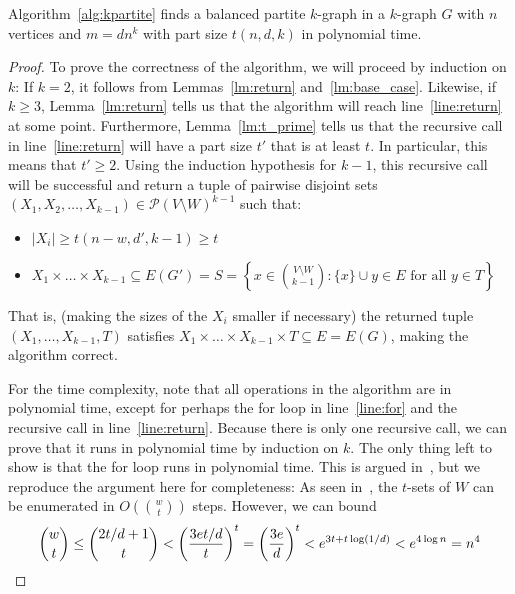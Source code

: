 \begin{theorem}
    Algorithm~\ref{alg:kpartite} finds a balanced partite $k$-graph in a $k$-graph $G$ with
    $n$ vertices and $m = d n^k$ with part size $t(n, d, k)$ in polynomial time.
    \begin{proof}
        To prove the correctness of the algorithm, we will proceed by induction on $k$:
        If $k=2$, it follows from Lemmas~\ref{lm:return} and~\ref{lm:base_case}.
        Likewise, if $k \geq 3$, Lemma~\ref{lm:return} tells us that the algorithm will
        reach line~\ref{line:return} at some point.
        Furthermore, Lemma~\ref{lm:t_prime} tells us that the recursive call in line~\ref{line:return}
        will have a part size $t'$ that is at least $t$.
        In particular, this means that $t' \geq 2$.
        Using the induction hypothesis for $k-1$, this recursive call will be successful and
        return a tuple of pairwise disjoint sets
        $(X_1, X_2, \ldots, X_{k-1}) \in \mathcal{P}(V \setminus W)^{k-1}$ such that:
        \begin{itemize}
            \item $|X_i| \geq t(n-w, d', k-1) \geq t$

            \item $X_1 \times \dots \times X_{k-1} \subseteq E(G') = S =
            \left\{x \in \binom{V \setminus W}{k-1} : \{x\} \cup y \in E \text{ for all } y \in T\right\}$
        \end{itemize}

        That is, (making the sizes of the $X_i$ smaller if necessary) the returned tuple $(X_1, \dots, X_{k-1}, T)$
        satisfies $X_1 \times \dots \times X_{k-1} \times T \subseteq E = E(G)$, making the algorithm correct.

        For the time complexity, note that all operations in the algorithm are in polynomial time, %
        except for perhaps the for loop in line~\ref{line:for} and the recursive call in line~\ref{line:return}.
        Because there is only one recursive call, we can prove that it runs in polynomial time
        by induction on $k$.
        The only thing left to show is that the for loop runs in polynomial time.
        This is argued in~\cite{MUBAYI2010174}, but we reproduce the argument here for completeness:
        As seen in~\cite{reingold1977combinatorial}, the $t$-sets of $W$ can be enumerated in
        $O\left( \binom{w}{t} \right)$ steps.
        However, we can bound
        \[
            \binom{w}{t} \leq
            \binom{2t/d + 1}{t} <
            \left( \frac{3et/d}{t} \right)^{t} =
            \left( \frac{3e}{d} \right)^{t} <
            e^{3 t + t \log (1/d)} <
            e^{4 \log n} = n^4 \qedhere
        \]

    \end{proof}
\end{theorem}





